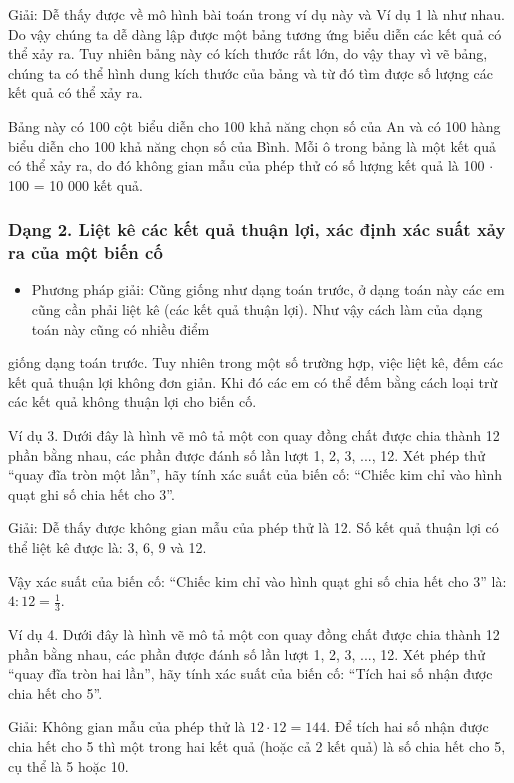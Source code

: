 \documentclass[%
    fontsize=12pt,%
    chapterprefix=false,%
    open=right,%
    twoside=false,%
    numbers=noenddot,%
    headings=optiontohead,%
    final,%
    DIV=15,%
    parskip=half %
]{scrbook}
\begin{document}
Giải: Dễ thấy được về mô hình bài toán trong ví dụ này và Ví dụ 1 là như nhau. Do vậy chúng ta dễ dàng lập được một bảng tương ứng biểu diễn các kết quả có thể xảy ra. Tuy nhiên bảng này có kích thước rất lớn, do vậy thay vì vẽ bảng, chúng ta có thể hình dung kích thước của bảng và từ đó tìm được số lượng các kết quả có thể xảy ra.

Bảng này có 100 cột biểu diễn cho 100 khả năng chọn số của An và có 100 hàng biểu diễn cho 100 khả năng chọn số của Bình. Mỗi ô trong bảng là một kết quả có thể xảy ra, do đó không gian mẫu của phép thử có số lượng kết quả là 100 $\cdot$ 100 = 10 000 kết quả.
\subsubsection{Dạng 2. Liệt kê các kết quả thuận lợi, xác định xác suất xảy ra của một biến cố}

\begin{itemize}
  \item Phương pháp giải: Cũng giống như dạng toán trước, ở dạng toán này các em cũng cần phải liệt kê (các kết quả thuận lợi). Như vậy cách làm của dạng toán này cũng có nhiều điểm
\end{itemize}


giống dạng toán trước. Tuy nhiên trong một số trường hợp, việc liệt kê, đếm các kết quả thuận lợi không đơn giản. Khi đó các em có thể đếm bằng cách loại trừ các kết quả không thuận lợi cho biến cố.

Ví dụ 3. Dưới đây là hình vẽ mô tả một con quay đồng chất được chia thành 12 phần bằng nhau, các phần được đánh số lần lượt 1, 2, 3, ..., 12. Xét phép thử ``quay đĩa tròn một lần'', hãy tính xác suất của biến cố: ``Chiếc kim chỉ vào hình quạt ghi số chia hết cho 3''.

Giải: Dễ thấy được không gian mẫu của phép thử là 12. Số kết quả thuận lợi có thể liệt kê được là: 3, 6, 9 và 12.

Vậy xác suất của biến cố: ``Chiếc kim chỉ vào hình quạt ghi số chia hết cho 3'' là: $4 : 12 = \frac{1}{3}$.

Ví dụ 4. Dưới đây là hình vẽ mô tả một con quay đồng chất được chia thành 12 phần bằng nhau, các phần được đánh số lần lượt 1, 2, 3, ..., 12. Xét phép thử ``quay đĩa tròn hai lần'', hãy tính xác suất của biến cố: ``Tích hai số nhận được chia hết cho 5''.

Giải: Không gian mẫu của phép thử là $12 \cdot 12 = 144$. Để tích hai số nhận được chia hết cho 5 thì một trong hai kết quả (hoặc cả 2 kết quả) là số chia hết cho 5, cụ thể là 5 hoặc 10.
\end{document}
